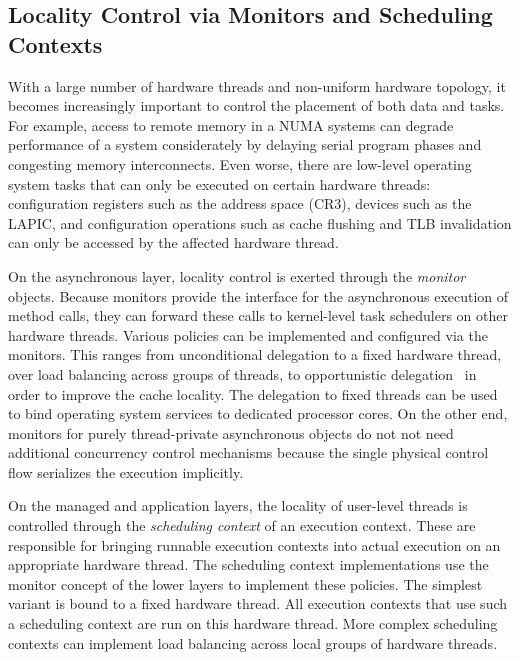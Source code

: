 \subsection{Locality Control via Monitors and Scheduling Contexts}
\label{sec:locality-control}

With a large number of hardware threads and non-uniform hardware topology, it becomes increasingly important to  control the placement of both data and tasks.
For example, access to remote memory in a NUMA systems can degrade  performance of a system considerately by delaying serial program phases and congesting memory interconnects.
Even worse, there are low-level operating system tasks that can only be executed on certain hardware threads: configuration registers such as the address space (CR3), devices such as the LAPIC, and configuration operations such as cache flushing and TLB invalidation can only be accessed by the affected hardware thread.

On the asynchronous layer, locality control is exerted through the \emph{monitor} objects. Because monitors provide the interface for the asynchronous execution of method calls, they can forward these calls to kernel-level task schedulers on other hardware threads. Various policies can be implemented and configured via the monitors. This ranges from unconditional delegation to a fixed hardware thread, over load balancing across groups of threads, to opportunistic delegation~\cite{FatourouKallimanis2012} in order to improve the cache locality. The delegation to fixed threads can be used to bind operating system services to dedicated processor cores.
On the other end, monitors for purely thread-private asynchronous objects do not not need additional concurrency control mechanisms because the single physical control flow serializes the execution implicitly.

On the managed and application layers, the locality of user-level threads is controlled through the \emph{scheduling context} of an execution context. These are responsible for bringing runnable execution contexts into actual execution on an appropriate hardware thread. The scheduling context implementations use the monitor concept of the lower layers to implement these policies. The simplest variant is bound to a fixed hardware thread. All execution contexts that use such a scheduling context are run on this hardware thread. More complex scheduling contexts can implement load balancing across local groups of hardware threads. 

